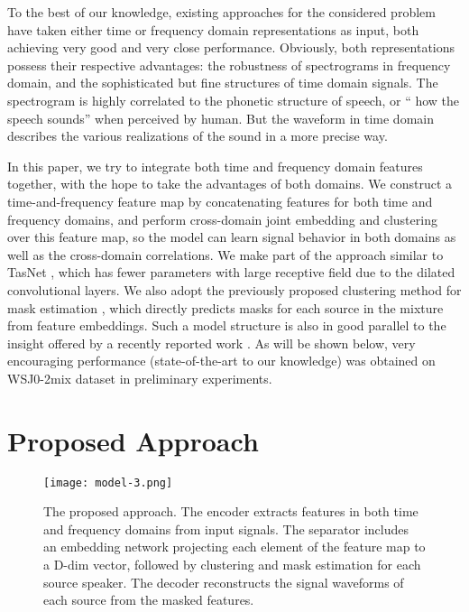 \documentclass[a4paper]{article}
\begin{document}
To the best of our knowledge, existing approaches for the considered problem have taken either time or frequency domain representations as input, both achieving very good and very close performance. Obviously, both representations possess their respective advantages: the robustness of spectrograms in frequency domain, and the sophisticated but fine structures of time domain signals. The spectrogram is highly correlated to the phonetic structure of speech, or  `` how the speech sounds'' when perceived by human. But the waveform in time domain describes the various realizations of the sound in a more precise way.

In this paper, we try to integrate both time and frequency domain features together, with the hope to take the advantages of both domains. We construct a time-and-frequency feature map by concatenating features for both time and frequency domains, and perform cross-domain joint embedding and clustering over this feature map, so the model can learn signal behavior in both domains as well as the cross-domain correlations. We make part of the approach similar to TasNet \cite{luo2018tasnet}, which has fewer parameters with large receptive field due to the dilated convolutional layers. We also adopt the previously proposed clustering method for mask estimation \cite{luo2018speaker}, which directly predicts masks for each source in the mixture from feature embeddings. Such a model structure is also in good parallel to the insight offered by a recently reported work \cite{ravanelli2018speaker}. As will be shown below, very encouraging performance (state-of-the-art to our knowledge) was obtained on WSJ0-2mix dataset in preliminary experiments.












\section{Proposed Approach}



\begin{figure*}[t]
  \centering
  \texttt{[image: model-3.png]}
  \caption{The proposed approach. The encoder extracts features in both time and frequency domains from input signals. The separator includes an embedding network projecting each element of the feature map to a D-dim vector, followed by clustering and mask estimation for each source speaker. The decoder reconstructs the signal waveforms of each source from the masked features.} 
  \label{fig:Architecture}
\end{figure*}
\end{document}
